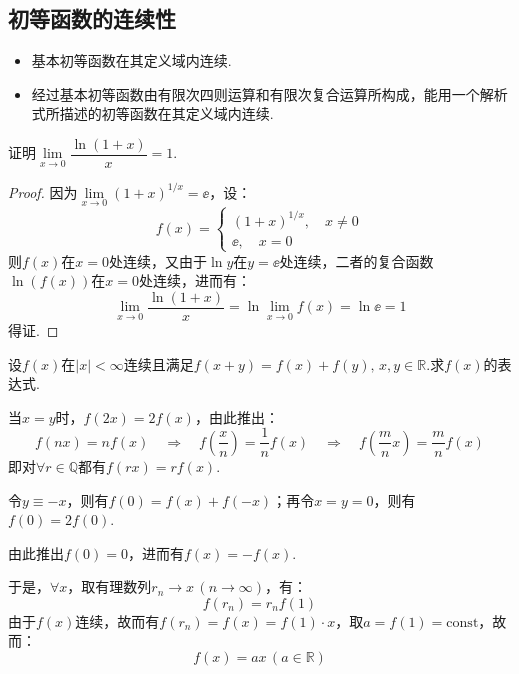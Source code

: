 \subsection{初等函数的连续性}
\begin{theorem}
    \begin{itemize}
        \item 基本初等函数在其定义域内连续.
        \item 经过基本初等函数由有限次四则运算和有限次复合运算所构成，能用一个解析式所描述的初等函数在其定义域内连续.
    \end{itemize}
\end{theorem}

\begin{question}
    证明$\lim\limits_{x\to 0}\dfrac{\ln(1+x)}{x}=1$.
\end{question}

\begin{proof}
    因为$\lim\limits_{x\to 0}(1+x)^{1/x}=\ee$，设：
    \[f(x)=\begin{cases}
        (1+x)^{1/x},\quad x \neq 0\\
        \ee,\quad x=0
    \end{cases}\]
    则$f(x)$在$x=0$处连续，又由于$\ln y$在$y=\ee$处连续，二者的复合函数$\ln(f(x))$在$x=0$处连续，进而有：
    \[\lim_{x\to 0}\frac{\ln(1+x)}{x} = \ln \lim_{x\to 0}f(x) = \ln \ee = 1\]
    得证.
\end{proof}

\begin{question}
    设$f(x)$在$|x|<\infty$连续且满足$f(x+y)=f(x)+f(y),\,x,y\in\mathbb{R}$.求$f(x)$的表达式.
\end{question}

\begin{solution}
    当$x=y$时，$f(2x)=2f(x)$，由此推出：
    \[f(nx)=nf(x) \quad\Rightarrow\quad f(\frac{x}{n})=\frac{1}{n}f(x) \quad\Rightarrow\quad f\left(\frac{m}{n}x\right)=\frac{m}{n}f(x)\]
    即对$\forall r \in \mathbb{Q}$都有$f(rx)=rf(x)$.

    令$y\equiv -x$，则有$f(0)=f(x)+f(-x)$；再令$x=y=0$，则有$f(0)=2f(0)$.

    由此推出$f(0)=0$，进而有$f(x)=-f(x)$.

    于是，$\forall x$，取有理数列$r_n \to x\,(n\to\infty)$，有：
    \[f(r_n)=r_n f(1)\]
    由于$f(x)$连续，故而有$f(r_n) = f(x) = f(1)\cdot x$，取$a=f(1)=\text{const}$，故而：
    \[f(x)=ax\,(a \in \mathbb{R})\]
\end{solution}


